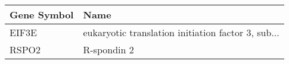 \begin{tabular}{ll}
\toprule
Gene Symbol &                                               Name \\
\midrule
      EIF3E & eukaryotic translation initiation factor 3, sub... \\
      RSPO2 &                                        R-spondin 2 \\
\bottomrule
\end{tabular}
